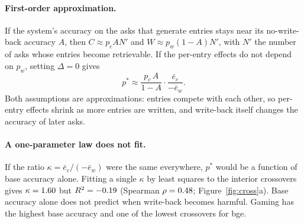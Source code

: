 \documentclass[11pt]{article}
\begin{document}
\paragraph{First-order approximation.} If the system's accuracy on the asks that generate entries stays near its no-write-back accuracy $A$, then $C\approx p_c A N'$ and $W\approx p_w(1-A)N'$, with $N'$ the number of asks whose entries become retrievable. If the per-entry effects do not depend on $p_w$, setting $\Delta=0$ gives
\begin{equation}
p^* \approx \frac{p_c\,A}{1-A}\cdot\frac{\bar e_c}{-\bar e_w}.
\label{eq:pstar}
\end{equation}
Both assumptions are approximations: entries compete with each other, so per-entry effects shrink as more entries are written, and write-back itself changes the accuracy of later asks.

\paragraph{A one-parameter law does not fit.} If the ratio $\kappa=\bar e_c/(-\bar e_w)$ were the same everywhere, $p^*$ would be a function of base accuracy alone. Fitting a single $\kappa$ by least squares to the \nOne{} interior crossovers gives $\kappa=1.60$ but $R^2=-0.19$ (Spearman $\rho=0.48$; Figure~\ref{fig:cross}a). Base accuracy alone does not predict when write-back becomes harmful. Gaming has the highest base accuracy and one of the lowest crossovers for bge.
\end{document}
